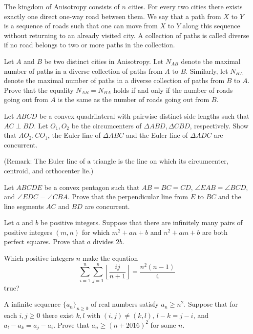 \documentclass[11pt]{scrartcl}
\begin{document}
\begin{problem}[9103148252094553273]
	The kingdom of Anisotropy consists of $n$ cities. For every two cities there exists exactly one direct one-way road between them. We say that a path from $X$ to $Y$ is a sequence of roads such that one can move from $X$ to $Y$ along this sequence without returning to an already visited city. A collection of paths is called diverse if no road belongs to two or more paths in the collection.

Let $A$ and $B$ be two distinct cities in Anisotropy. Let $N_{AB}$ denote the maximal number of paths in a diverse collection of paths from $A$ to $B$. Similarly, let $N_{BA}$ denote the maximal number of paths in a diverse collection of paths from $B$ to $A$. Prove that the equality $N_{AB} = N_{BA}$ holds if and only if the number of roads going out from $A$ is the same as the number of roads going out from $B$.
\end{problem}
\begin{problem}[8963205841174892420]
	Let $ABCD$ be a convex quadrilateral with pairwise distinct side lengths such that $AC\perp BD$. Let $O_1,O_2$ be the circumcenters of $\Delta ABD, \Delta CBD$, respectively. Show that $AO_2, CO_1$, the Euler line of $\Delta ABC$ and the Euler line of $\Delta ADC$ are concurrent.

(Remark: The Euler line of a triangle is the line on which its circumcenter, centroid, and orthocenter lie.)
\end{problem}
\begin{problem}[7997372712267182584]
Let $ABCDE$ be a convex pentagon such that $AB=BC=CD$, $\angle{EAB}=\angle{BCD}$, and $\angle{EDC}=\angle{CBA}$. Prove that the perpendicular line from $E$ to $BC$ and the line segments $AC$ and $BD$ are concurrent.
\end{problem}
\begin{problem}[8948164820835424145]
Let $a$ and $b$ be positive integers. Suppose that there are infinitely many pairs of positive integers $(m,n)$ for which $m^2+an+b$ and $n^2+am+b$ are both perfect squares. Prove that $a$ divides $2b$.
\end{problem}
\begin{problem}[819328919046836]
Which positive integers $n$ make the equation\[\sum_{i=1}^n \sum_{j=1}^n \left\lfloor \frac{ij}{n+1} \right\rfloor=\frac{n^2(n-1)}{4}\]true?
\end{problem}
\begin{problem}[748293992911976]
	A infinite sequence $\{ a_n \}_{n \ge 0}$ of real numbers satisfy $a_n \ge n^2$. Suppose that for each $i, j \ge 0$ there exist $k, l$ with $(i,j) \neq (k,l)$, $l - k = j - i$, and $a_l - a_k = a_j - a_i$. Prove that $a_n \ge (n + 2016)^2$ for some $n$.
\end{problem}
\end{document}
